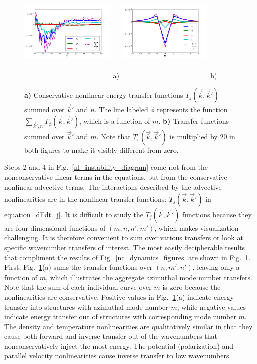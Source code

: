 \documentclass[showpacs,preprintnumbers,amsmath,amssymb,superscriptaddress]{revtex4}
\begin{document}
\begin{figure}[!htbp]
\includegraphics[width=0.40\textwidth,height=50mm]{T_m}~a)
\hfil
\includegraphics[width=0.40\textwidth,height=50mm]{T_n}~b)
\hfil
\caption{\textbf{a)} Conservative nonlinear energy transfer functions $T_j(\vec{k},\vec{k}')$ summed over $\vec{k}'$ and $n$. 
The line labeled $\phi$ represents the function $\sum_{\vec{k}',n} T_\phi(\vec{k},\vec{k}')$,
which is a function of $m$. 
\textbf{b)} Transfer functions summed over $\vec{k}'$ and $m$. Note that $T_v(\vec{k},\vec{k}')$ is multiplied by $20$ in both figures to make it visibly different from zero.}
\label{conservative_transfers}
\end{figure}


Steps 2 and 4 in Fig.~\ref{nl_instability_diagram} come not from the nonconservative linear terms in the equations, but from the conservative nonlinear advective terms.
The interactions described by the advective nonlinearities are in the nonlinear transfer functions: $T_{j}(\vec{k},\vec{k}')$ in equation~\ref{dEdt_j}.
It is difficult to study the $T_{j}(\vec{k},\vec{k}')$ functions because they are four dimensional functions of $(m,n,n',m')$, 
which makes visualization challenging. It is therefore convenient to sum over various transfers or look at specific wavenumber transfers of interest. The most easily decipherable
results that compliment the results of Fig.~\ref{nc_dynamics_figures} are shown in Fig.~\ref{conservative_transfers}. First, Fig.~\ref{conservative_transfers}(a) sums the transfer functions over
$(n,m',n')$, leaving only a function of $m$, which illustrates the aggregate azimuthal mode
number transfers. Note that the sum of each individual curve over $m$ is zero because the nonlinearities are conservative. Positive values in Fig.~\ref{conservative_transfers}(a)
indicate energy transfer into structures with azimuthal mode number $m$, while negative values indicate energy transfer out of structures with corresponding mode number $m$. 
The density and temperature nonlinearities
are qualitatively similar in that they cause both forward and inverse transfer out of the wavenumbers that nonconservatively inject the most energy. The potential (polarization) and parallel velocity 
nonlinearities cause inverse transfer to low wavenumbers. 
\end{document}
